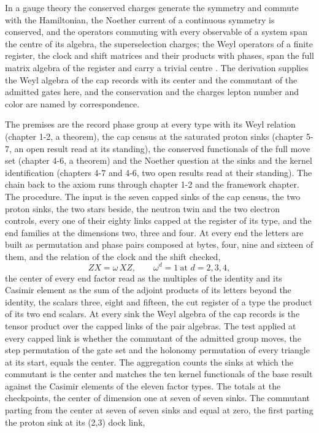 \begin{chbridge}
In a gauge theory the conserved charges generate the symmetry and commute with the Hamiltonian, the Noether current of a continuous symmetry is conserved, and the operators commuting with every observable of a system span the centre of its algebra, the superselection charges; the Weyl operators of a finite register, the clock and shift matrices and their products with phases, span the full matrix algebra of the register and carry a trivial centre \cite{Noether1918,Weyl1927}. The derivation supplies the Weyl algebra of the cap records with its center and the commutant of the admitted gates here, and the conservation and the charges lepton number and color are named by correspondence.
\end{chbridge}
\begin{chproof}
The premises are the record phase group at every type with its Weyl relation (chapter 1-2, a theorem), the cap census at the saturated proton sinks (chapter 5-7, an open result read at its standing), the conserved functionals of the full move set (chapter 4-6, a theorem) and the Noether question at the sinks and the kernel identification (chapters 4-7 and 4-6, two open results read at their standing). The chain back to the axiom runs through chapter 1-2 and the framework chapter. The procedure. The input is the seven capped sinks of the cap census, the two proton sinks, the two stars beside, the neutron twin and the two electron controls, every one of their eighty links capped at the register of its type, and the end families at the dimensions two, three and four. At every end the letters are built as permutation and phase pairs composed at bytes, four, nine and sixteen of them, and the relation of the clock and the shift checked,
\begin{equation}
ZX = \omega\, XZ,\qquad \omega^{d} = 1 \ \text{at } d = 2, 3, 4 ,
\end{equation}
the center of every end factor read as the multiples of the identity and its Casimir element as the sum of the adjoint products of its letters beyond the identity, the scalars three, eight and fifteen, the cut register of a type the product of its two end scalars. At every sink the Weyl algebra of the cap records is the tensor product over the capped links of the pair algebras. The test applied at every capped link is whether the commutant of the admitted group moves, the step permutation of the gate set and the holonomy permutation of every triangle at its start, equals the center. The aggregation counts the sinks at which the commutant is the center and matches the ten kernel functionals of the base result against the Casimir elements of the eleven factor types. The totals at the checkpoints, the center of dimension one at seven of seven sinks. The commutant parting from the center at seven of seven sinks and equal at zero, the first parting the proton sink at its (2,3) dock link,

\end{chproof}
